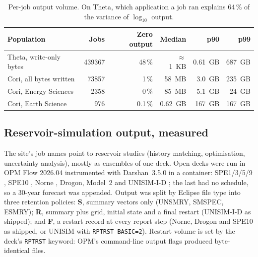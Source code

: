 \documentclass[11pt,a4paper]{article}
\newcommand{\code}[1]{\texttt{#1}}
\begin{document}
\begin{table}[ht]
\centering\small
\caption{Per-job output volume. On Theta, which application a job ran explains
64\,\% of the variance of $\log_{10}$ output.}\label{tab:darshan}
\begin{tabular}{lrrrrr}
\toprule
Population & Jobs & Zero output & Median & p90 & p99 \\
\midrule
Theta, write-only bytes & \num{439367} & 48\,\% & $\approx$\SI{1}{KB} & \SI{0.61}{GB} & \SI{687}{GB} \\
Cori, all bytes written & \num{73857}  & 1\,\%  & \SI{58}{MB}  & \SI{3.0}{GB} & \SI{235}{GB} \\
Cori, Energy Sciences   & \num{2358}   & 0\,\%  & \SI{85}{MB}  & \SI{5.1}{GB} & \SI{24}{GB}  \\
Cori, Earth Science     & 976          & 0.1\,\%& \SI{0.62}{GB}& \SI{167}{GB} & \SI{167}{GB} \\
\bottomrule
\end{tabular}
\end{table}

\subsection{Reservoir-simulation output, measured}
The site's job names point to reservoir studies (history matching, optimisation,
uncertainty analysis), mostly as ensembles of one deck. Open decks were run in
OPM Flow 2026.04 \citep{rasmussen2021opm} instrumented with Darshan~3.5.0 in a
container: SPE1/3/5/9 \citep{killough1995ninth}, SPE10 \citep{christie2001tenth},
Norne \citep{rwechungura2010norne}, Drogon, Model~2 and UNISIM-I-D
\citep{avansi2015unisim}; the last had no schedule, so a 30-year forecast was
appended. Output was split by Eclipse file type into three retention policies:
\textbf{S}, summary vectors only (UNSMRY, SMSPEC, ESMRY);
\textbf{R}, summary plus grid, initial state and a final restart (UNISIM-I-D as
shipped); and \textbf{F}, a restart record at every report step (Norne, Drogon
and SPE10 as shipped, or UNISIM with \code{RPTRST BASIC=2}). Restart volume is set
by the deck's \code{RPTRST} keyword: OPM's command-line output flags produced
byte-identical files.
\end{document}

